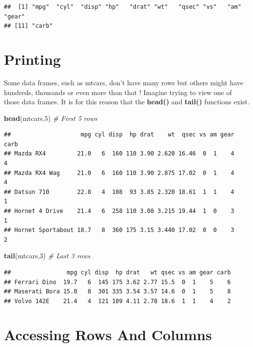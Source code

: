 \documentclass[]{book}
\newenvironment{Shaded}{\begin{snugshade}}{\end{snugshade}}
\newcommand{\CommentTok}[1]{\textcolor[rgb]{0.56,0.35,0.01}{\textit{#1}}}
\newcommand{\DecValTok}[1]{\textcolor[rgb]{0.00,0.00,0.81}{#1}}
\newcommand{\KeywordTok}[1]{\textcolor[rgb]{0.13,0.29,0.53}{\textbf{#1}}}
\newcommand{\NormalTok}[1]{#1}
\begin{document}
\begin{verbatim}
##  [1] "mpg"  "cyl"  "disp" "hp"   "drat" "wt"   "qsec" "vs"   "am"   "gear"
## [11] "carb"
\end{verbatim}

\hypertarget{printing}{%
\section{Printing}\label{printing}}

Some data frames, such as mtcars, don't have many rows but others might have hundreds, thousands or even more than that ! Imagine trying to view one of those data frames. It is for this reason that the \textbf{head()} and \textbf{tail()} functions exist.

\begin{Shaded}
\begin{Highlighting}[]
\KeywordTok{head}\NormalTok{(mtcars,}\DecValTok{5}\NormalTok{) }\CommentTok{# First 5 rows}
\end{Highlighting}
\end{Shaded}

\begin{verbatim}
##                    mpg cyl disp  hp drat    wt  qsec vs am gear carb
## Mazda RX4         21.0   6  160 110 3.90 2.620 16.46  0  1    4    4
## Mazda RX4 Wag     21.0   6  160 110 3.90 2.875 17.02  0  1    4    4
## Datsun 710        22.8   4  108  93 3.85 2.320 18.61  1  1    4    1
## Hornet 4 Drive    21.4   6  258 110 3.08 3.215 19.44  1  0    3    1
## Hornet Sportabout 18.7   8  360 175 3.15 3.440 17.02  0  0    3    2
\end{verbatim}

\begin{Shaded}
\begin{Highlighting}[]
\KeywordTok{tail}\NormalTok{(mtcars,}\DecValTok{3}\NormalTok{) }\CommentTok{# Last 3 rows}
\end{Highlighting}
\end{Shaded}

\begin{verbatim}
##                mpg cyl disp  hp drat   wt qsec vs am gear carb
## Ferrari Dino  19.7   6  145 175 3.62 2.77 15.5  0  1    5    6
## Maserati Bora 15.0   8  301 335 3.54 3.57 14.6  0  1    5    8
## Volvo 142E    21.4   4  121 109 4.11 2.78 18.6  1  1    4    2
\end{verbatim}

\hypertarget{accessing-rows-and-columns}{%
\section{Accessing Rows And Columns}\label{accessing-rows-and-columns}}
\end{document}
